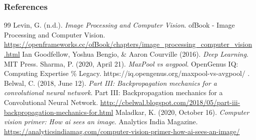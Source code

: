 \documentclass[11pt,compress,t,notes=noshow, xcolor=table]{beamer}
\begin{document}
\begin{vbframe}
\frametitle{References}
\footnotesize{
\begin{thebibliography}{99}
 Levin, G. (n.d.). \textit{Image Processing and Computer Vision}. ofBook - Image Processing and Computer Vision. \url{https://openframeworks.cc/ofBook/chapters/image_processing_computer_vision.html}
 Ian Goodfellow, Yoshua Bengio, \& Aaron Courville (2016). \textit{Deep Learning}. MIT Press.
 Sharma, P. (2020, April 21). \textit{MaxPool vs avgpool}. OpenGenus IQ: Computing Expertise \% Legacy. https://iq.opengenus.org/maxpool-vs-avgpool/ .
 Belwal, C. (2018, June 12). \textit{Part III: Backpropagation mechanics for a convolutional neural network}. Part III: Backpropagation mechanics for a Convolutional Neural Network. \url{http://cbelwal.blogspot.com/2018/05/part-iii-backpropagation-mechanics-for.html} 
 Maladkar, K. (2020, October 16). \textit{Computer vision primer: How ai sees an image}. Analytics India Magazine. \url{https://analyticsindiamag.com/computer-vision-primer-how-ai-sees-an-image/} 
\end{thebibliography}
}
\end{vbframe}


\endlecture
\end{document}
